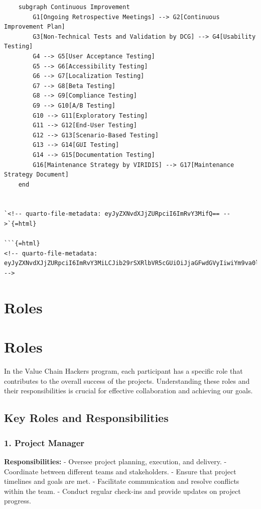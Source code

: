 \documentclass[
  letterpaper,
  DIV=11,
  numbers=noendperiod]{scrreprt}
\begin{document}
\begin{verbatim}
    subgraph Continuous Improvement
        G1[Ongoing Retrospective Meetings] --> G2[Continuous Improvement Plan]
        G3[Non-Technical Tests and Validation by DCG] --> G4[Usability Testing]
        G4 --> G5[User Acceptance Testing]
        G5 --> G6[Accessibility Testing]
        G6 --> G7[Localization Testing]
        G7 --> G8[Beta Testing]
        G8 --> G9[Compliance Testing]
        G9 --> G10[A/B Testing]
        G10 --> G11[Exploratory Testing]
        G11 --> G12[End-User Testing]
        G12 --> G13[Scenario-Based Testing]
        G13 --> G14[GUI Testing]
        G14 --> G15[Documentation Testing]
        G16[Maintenance Strategy by VIRIDIS] --> G17[Maintenance Strategy Document]
    end


`<!-- quarto-file-metadata: eyJyZXNvdXJjZURpciI6ImRvY3MifQ== -->`{=html}

```{=html}
<!-- quarto-file-metadata: eyJyZXNvdXJjZURpciI6ImRvY3MiLCJib29rSXRlbVR5cGUiOiJjaGFwdGVyIiwiYm9va0l0ZW1OdW1iZXIiOjEwLCJib29rSXRlbUZpbGUiOiJkb2NzL3JvbGVzLnFtZCIsImJvb2tJdGVtRGVwdGgiOjB9 -->
\end{verbatim}


\chapter{Roles}\label{roles}


\chapter{Roles}\label{roles-1}

In the Value Chain Hackers program, each participant has a specific role
that contributes to the overall success of the projects. Understanding
these roles and their responsibilities is crucial for effective
collaboration and achieving our goals.

\section{Key Roles and
Responsibilities}\label{key-roles-and-responsibilities}

\subsection{1. Project Manager 📝}\label{project-manager}

\textbf{Responsibilities:} - Oversee project planning, execution, and
delivery. - Coordinate between different teams and stakeholders. -
Ensure that project timelines and goals are met. - Facilitate
communication and resolve conflicts within the team. - Conduct regular
check-ins and provide updates on project progress.
\end{document}
